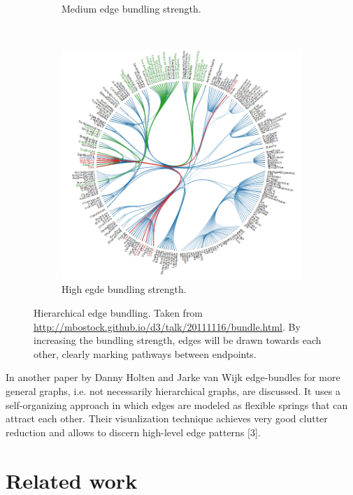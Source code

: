 \begin{figure}
\begin{subfigure}[b]{0.3\textwidth}
					\caption{Medium edge bundling strength.}
					\label{figure:hierarchical_edge-bundling2}
	\end{subfigure}
	~
	\begin{subfigure}[b]{0.3\textwidth}
					\centering
					\includegraphics[width=\textwidth]{img/hierarchical_edge-bundling3}
					\caption{High egde bundling strength.}
					\label{figure:hierarchical_edge-bundling3}
	\end{subfigure}
	\caption{Hierarchical edge bundling. Taken from \url{http://mbostock.github.io/d3/talk/20111116/bundle.html}. By increasing the bundling strength, edges will be drawn towards each other, clearly marking pathways between endpoints.}%
	\label{figure:hierarchical_edge_bundling}%
\end{figure}


In another paper by Danny Holten and Jarke van Wijk edge-bundles for more general graphs, i.e. not necessarily hierarchical graphs, are discussed. It uses a self-organizing approach in which edges are modeled as flexible springs that can attract each other. Their visualization technique achieves very good clutter reduction and allows to discern high-level edge patterns [3].


% 
\section{Related work}\label{chapter:survey:section:applications}

